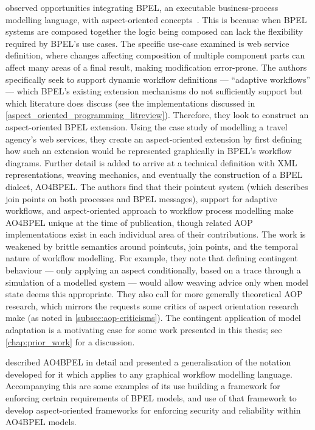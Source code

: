 \citeauthor{charfi2007ao4bpel} observed opportunities integrating BPEL, an
executable business-process modelling language, with aspect-oriented
concepts~\cite{charfi2007ao4bpel}. This is because when BPEL systems are
composed together the logic being composed can lack the flexibility required by
BPEL's use cases. The specific use-case examined is web service definition,
where changes affecting composition of multiple component parts can affect many
areas of a final result, making modification error-prone. The authors
specifically seek to support dynamic workflow definitions --- ``adaptive
workflows'' --- which BPEL's existing extension mechanisms do not sufficiently
support but which \aspectorientation{} literature does discuss (see the \aop{}
implementations discussed in \cref{aspect_oriented_programming_litreview}). Therefore, they look to
construct an aspect-oriented BPEL extension. Using the case study of modelling a
travel agency's web services, they create an aspect-oriented extension by first
defining how such an extension would be represented graphically in BPEL's
workflow diagrams. Further detail is added to arrive at a technical definition
with XML representations, weaving mechanics, and eventually the construction of
a BPEL dialect, AO4BPEL. The authors find that their pointcut system (which
describes join points on both processes and BPEL messages), support for adaptive
workflows, and aspect-oriented approach to workflow process modelling make
AO4BPEL unique at the time of publication, though related AOP implementations
exist in each individual area of their contributions. The work is weakened by
brittle semantics around pointcuts, join points, and the temporal nature of
workflow modelling. For example, they note that defining contingent behaviour
--- only applying an aspect conditionally, based on a trace through a simulation
of a modelled system --- would allow weaving advice only when model
state deems this appropriate. They also call for more generally theoretical AOP
research, which mirrors the requests some critics of aspect orientation research
make (as noted in \cref{subsec:aop-criticisms}). The contingent application of
model adaptation is a motivating case for some work presented in this thesis;
see \cref{chap:prior_work} for a discussion.

\citet{Charfi2006AspectOrientedWL} described AO4BPEL in detail and presented a
generalisation of the notation developed for it which applies to any graphical
workflow modelling language. Accompanying this are some examples of its use
building a framework for enforcing certain requirements of BPEL models, and use
of that framework to develop aspect-oriented frameworks for enforcing security
and reliability within AO4BPEL models.

